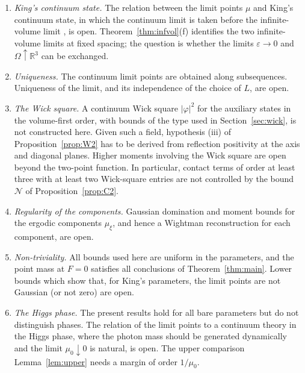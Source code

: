 \documentclass[11pt]{amsart}
\theoremstyle{plain}
\theoremstyle{definition}
\theoremstyle{remark}
\numberwithin{equation}{section}
\newcommand{\R}{\mathbb{R}}
\newcommand{\eps}{\varepsilon}
\newcommand{\abs}[1]{\lvert #1\rvert}
\begin{document}
\begin{enumerate}
\[\]
for real test two-forms $f,h$ of compact support, would give the conclusion of Corollary~\ref{cor:torus} for the joint limit points at $\mu_0\notin\mathsf E$; it is open. The states of \cite{v1} at zero photon mass, the limit $\mu_0\downarrow0$ and the state $\flat$ of \cite[Def.~2.7]{v1}, are not reached, since the argument needs $\mu_0>0$.
\item \emph{King's continuum state.} The relation between the limit points $\mu$ and King's continuum state, in which the continuum limit is taken before the infinite-volume limit \cite[Thms.~2.1--2.2]{K2}, is open. Theorem~\ref{thm:infvol}(f) identifies the two infinite-volume limits at fixed spacing; the question is whether the limits $\eps\to0$ and $\Omega\uparrow\R^3$ can be exchanged.
\item \emph{Uniqueness.} The continuum limit points are obtained along subsequences. Uniqueness of the limit, and its independence of the choice of $L$, are open.
\item\label{op:wick} \emph{The Wick square.} A continuum Wick square $\abs\varphi^2$ for the auxiliary states in the volume-first order, with bounds of the type used in Section~\ref{sec:wick}, is not constructed here. Given such a field, hypothesis (iii) of Proposition~\ref{prop:W2} has to be derived from reflection positivity at the axis and diagonal planes. Higher moments involving the Wick square are open beyond the two-point function. In particular, contact terms of order at least three with at least two Wick-square entries are not controlled by the bound $\mathcal N$ of Proposition~\ref{prop:C2}.
\item \emph{Regularity of the components.} Gaussian domination and moment bounds for the ergodic components $\mu_\xi$, and hence a Wightman reconstruction for each component, are open.
\item \emph{Non-triviality.} All bounds used here are uniform in the parameters, and the point mass at $F=0$ satisfies all conclusions of Theorem~\ref{thm:main}. Lower bounds which show that, for King's parameters, the limit points are not Gaussian (or not zero) are open.
\item \emph{The Higgs phase.} The present results hold for all bare parameters but do not distinguish phases. The relation of the limit points to a continuum theory in the Higgs phase, where the photon mass should be generated dynamically and the limit $\mu_0\downarrow0$ is natural, is open. The upper comparison Lemma~\ref{lem:upper} needs a margin of order $1/\mu_0$.
\end{enumerate}
\end{document}
